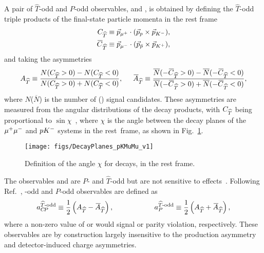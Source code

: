A pair of $\widehat{T}$-odd and $P$-odd observables, \AT and \ATbar, is obtained by defining the $\widehat{T}$-odd triple products of the final-state particle momenta in the \Lb rest frame
\begin{align}
{\ensuremath{C_{\widehat{T}}}} &\equiv \vec{p}_{\mu^+}\cdot (\vec{p}_{p}\times\vec{p}_{K^-}), \\
{\kern 0.1em\overline{\kern -0.1em C}_{\widehat{T}}} &\equiv \vec{p}_{\mu^-}\cdot (\vec{p}_{\bar{p}}\times\vec{p}_{K^+}),\label{eq::TP}
\end{align}
and taking the asymmetries
\begin{equation}
{\ensuremath{A_{\widehat{T}}}} \equiv \frac{N({C_{\widehat{T}}} > 0) - N({C_{\widehat{T}}} < 0)}{N({C_{\widehat{T}}} > 0) + N({C_{\widehat{T}}} < 0)},
\hspace{0.5cm}
{\ensuremath{\kern 0.1em\overline{\kern -0.1em A}_{\widehat{T}}}} \equiv \frac{\overline{N}(-{\kern 0.1em\overline{\kern -0.1em C}_{\widehat{T}}} > 0) - \overline{N}(-{\kern 0.1em\overline{\kern -0.1em C}_{\widehat{T}}} < 0)}{\overline{N}(-{\kern 0.1em\overline{\kern -0.1em C}_{\widehat{T}}} > 0) + \overline{N}(-{\kern 0.1em\overline{\kern -0.1em C}_{\widehat{T}}} < 0)},\label{eq::ATCP}
\end{equation}
where $N$($\overline{N}$) is the number of \Lb(\Lbbar) signal candidates. These asymmetries are measured from the angular distributions of the decay products, with ${C_{\widehat{T}}}$ being proportional to $\sin\chi$~\cite{Gronau:2011cf}, where $\chi$ is the angle between the decay planes of the ${\mu^+} {\mu^-}$ and $p{{K}^-}$ systems in the \mbox{\Lb rest frame}, as shown in Fig.~\ref{fig:phiangle}.

\begin{figure}
\centering
\texttt{[image: figs/DecayPlanes\_pKMuMu\_v1]}
\caption{Definition of the angle $\chi$ for \LK decays, in the \Lb rest frame.\label{fig:phiangle}}
\end{figure}

The observables \AT and \ATbar are $P$- and $\widehat{T}$-odd but are not sensitive to \CPV effects~\cite{Durieux:2015zwa}. Following Ref.~\cite{Gronau:2011cf}, \CP-odd and $P$-odd observables are defined as
\begin{equation}
a_{C\!P}^{\widehat{T}\text{-odd}} \equiv \frac{1}{2} \left( {A_{\widehat{T}}} - {\kern 0.1em\overline{\kern -0.1em A}_{\widehat{T}}}\right),\hspace{2cm} {\ensuremath{a_P^{\widehat{T}\text{-odd}}}} \equiv \frac{1}{2} \left( {A_{\widehat{T}}} + {\kern 0.1em\overline{\kern -0.1em A}_{\widehat{T}}}\right),
\label{eq::ACPTodd}
\end{equation}
where a non-zero value of \ACP or \aPTodd would signal \CP or parity violation, respectively.
These observables are by construction largely insensitive to the \Lb production asymmetry and detector-induced charge asymmetries.

